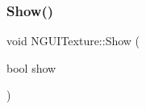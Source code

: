 \hypertarget{class_n_g_u_i_texture_ae23179192e505901ab045c6bb9147bc2}{}\label{class_n_g_u_i_texture_ae23179192e505901ab045c6bb9147bc2} 
\subsubsection{\texorpdfstring{Show()}{Show()}}
{\footnotesize\ttfamily void N\+G\+U\+I\+Texture\+::\+Show (\begin{DoxyParamCaption}\item[{bool}]{show }\end{DoxyParamCaption})}

